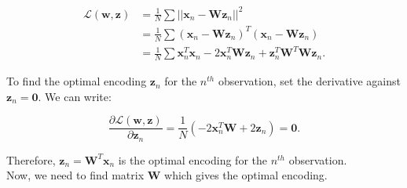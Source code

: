 \documentclass{article}\usepackage[]{graphicx}\usepackage[]{xcolor}
\numberwithin{equation}{section}
\begin{document}
{\begin{equation}
\begin{aligned}
\mathcal{L}(\mathbf{w},\mathbf{z}) &= \frac{1}{N}\sum ||\mathbf{x}_n - \mathbf{W}\mathbf{z}_n||^2  \\
&= \frac{1}{N}\sum (\mathbf{x}_n - \mathbf{W}\mathbf{z}_n)^T(\mathbf{x}_n - \mathbf{W}\mathbf{z}_n)  \\
&= \frac{1}{N}\sum \mathbf{x}_n^T\mathbf{x}_n - 2\mathbf{x}_n^T\mathbf{W}\mathbf{z}_n+\mathbf{z}_n^T\mathbf{W}^T\mathbf{W}\mathbf{z}_n .
\end{aligned}
\end{equation}

\noindent
To find the optimal encoding $\mathbf{z}_n$ for the $n^{th}$ observation, set the derivative against $\mathbf{z}_n = \mathbf{0}$. We can write:

$$\frac{\partial \mathcal{L}(\mathbf{w},\mathbf{z})}{\partial \mathbf{z}_n} = \frac{1}{N} (-2 \mathbf{x}_n^T\mathbf{W} + 2\mathbf{z}_n)= \mathbf{0}.$$

\noindent
Therefore, $\mathbf{z}_n = \mathbf{W}^T\mathbf{x}_n$ is the optimal encoding for the $n^{th}$ observation.\\

\noindent
Now, we need to find matrix $\mathbf{W}$ which gives the optimal encoding.\\


}
\end{document}
